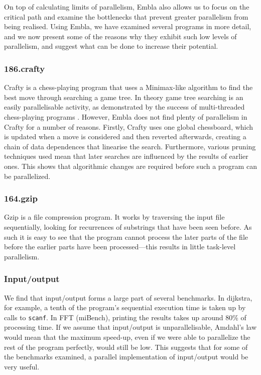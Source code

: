 On top of calculating limits of parallelism, Embla also allows us to focus on the critical path and examine the bottlenecks that prevent greater parallelism from being realised.
Using Embla, we have examined several programs in more detail, and we now present some of the reasons why they exhibit such low levels of parallelism, and suggest what can be done to increase their potential.

\subsubsection{186.crafty}

Crafty is a chess-playing program that uses a Minimax-like algorithm to find the best move through searching a game tree.
In theory game tree searching is an easily parallelisable activity, as demonstrated by the success of multi-threaded chess-playing programs \cite{Dailey01usingcilk}.
However, Embla does not find plenty of parallelism in Crafty for a number of reasons.
Firstly, Crafty uses one global chessboard, which is updated when a move is considered and then reverted afterwards, creating a chain of data dependences that linearise the search.
Furthermore, various pruning techniques used mean that later searches are influenced by the results of earlier ones.
This shows that algorithmic changes are required before such a program can be parallelized.

\subsubsection{164.gzip}

Gzip is a file compression program.
It works by traversing the input file sequentially, looking for recurrences of substrings that have been seen before.
As such it is easy to see that the program cannot process the later parts of the file before the earlier parts have been processed---this results in little task-level parallelism.

\subsubsection{Input/output}

We find that input/output forms a large part of several benchmarks.
In dijkstra, for example, a tenth of the program's sequential execution time is taken up by calls to \texttt{scanf}.
In FFT (miBench), printing the results takes up around 80\% of processing time.
If we assume that input/output is unparallelisable, Amdahl's law would mean that the maximum speed-up, even if we were able to parallelize the rest of the program perfectly, would still be low.
This suggests that for some of the benchmarks examined, a parallel implementation of input/output would be very useful.

